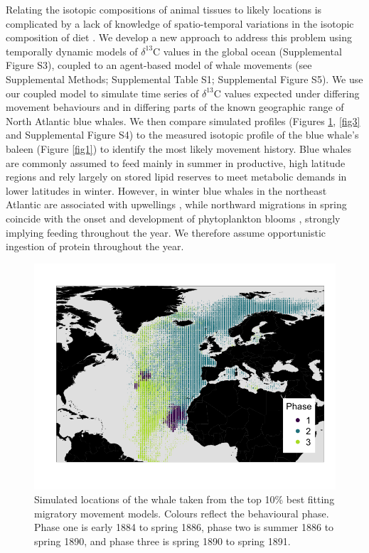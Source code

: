 \documentclass[a4paper,12pt]{article}
\begin{document}
Relating the isotopic compositions of animal tissues to likely locations is complicated by a lack of knowledge of spatio-temporal variations in the isotopic composition of diet \cite{west2006stable,mcmahon2015millennial}.
We develop a new approach to address this problem using temporally dynamic models of $\delta^{13}$C values in the global ocean \cite{magozzi2017using} (Supplemental Figure S3), coupled to an agent-based model of whale movements (see Supplemental Methods; Supplemental Table S1; Supplemental Figure S5).  
We use our coupled model to simulate time series of $\delta^{13}$C values expected under differing movement behaviours and in differing parts of the known geographic range of North Atlantic blue whales. 
We then compare simulated profiles (Figures \ref{fig2}, \ref{fig3} and Supplemental Figure S4) to the measured isotopic profile of the blue whale's baleen (Figure \ref{fig1}) to identify the most likely movement history. 
Blue whales are commonly assumed to feed mainly in summer in productive, high latitude regions and rely largely on stored lipid reserves to meet metabolic demands in lower latitudes in winter. 
However, in winter blue whales in the northeast Atlantic are associated with upwellings \cite{baines2017autumn}, while northward migrations in spring coincide with the onset and development of phytoplankton blooms \cite{silva2013north,visser2011timing,busquets2017estimating}, strongly implying feeding throughout the year. 
We therefore assume opportunistic ingestion of protein throughout the year. 

\begin{figure}
 \centering
 \includegraphics[width = \linewidth]{figures/Figure-2-points.png}
  \caption{Simulated locations of the whale taken from the top 10\% best fitting migratory movement models. 
  Colours reflect the behavioural phase. 
  Phase one is early 1884 to spring 1886, phase two is summer 1886 to spring 1890, and phase three is spring 1890 to spring 1891.}
  \label{fig2}
\end{figure}
\end{document}
